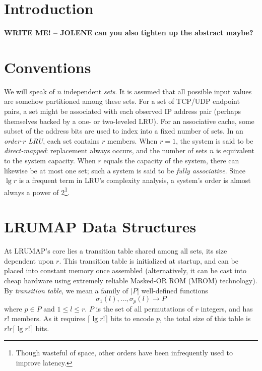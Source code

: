\documentclass[letterpaper,10pt]{article}
\begin{document}
\begin{multicols}{2}
\section{Introduction}
\textbf{WRITE ME! -- JOLENE}
\textbf{can you also tighten up the abstract maybe?}
\cite{varghese}
\cite{xu}

\section{Conventions}
We will speak of $n$ independent \textit{sets}. It is assumed that all possible
input values are somehow partitioned among these sets. For a set of TCP/UDP
endpoint pairs, a set might be associated with each observed IP address pair
(perhaps themselves backed by a one- or two-leveled LRU). For an associative
cache, some subset of the address bits are used to index into a fixed number of
sets. In an \textit{order-$r$ LRU}, each set contains $r$ members. When $r=1$,
the system is said to be \textit{direct-mapped}: replacement always occurs, and
the number of sets $n$ is equivalent to the system capacity. When $r$ equals
the capacity of the system, there can likewise be at most one set; such a system
is said to be \textit{fully associative}. Since $\lg{r}$ is a frequent term in
LRU's complexity analysis, a system's order is almost always a power of 2\footnote{Though
wasteful of space, other orders have been infrequently used to improve latency\cite{intelcpuid}.}.
\section{LRUMAP Data Structures}
At LRUMAP's core lies a transition table shared among all sets, its size
dependent upon $r$. This transition table is initialized at startup, and can be
placed into constant memory once assembled (alternatively, it can be cast into
cheap hardware using extremely reliable Masked-OR ROM (MROM)
technology\cite{ice}). By \textit{transition table}, we mean a family of $|P|$
well-defined functions \begin{equation*}
\sigma_{1}(l),\dotsc,\sigma_{p}(l)\longrightarrow{P}
\end{equation*} where $p\in{P}$ and $1\le{l}\le{r}$. $P$ is the set of all
permutations of $r$ integers, and has $r!$ members. As it requires $\lceil\lg{r!}\rceil$
bits to encode $p$, the total size of this table is $r!r\lceil\lg{r!}\rceil$ bits.


\end{multicols}
\end{document}
